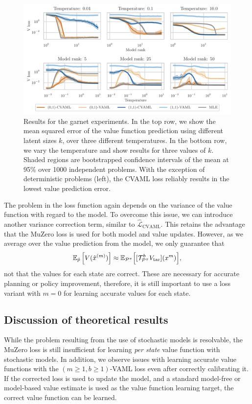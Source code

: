 \begin{figure}[t]
    \centering
    \includegraphics[width=.9\linewidth]{figures/lambda/plts/v_loss_comparison.pdf}
    \caption{Results for the garnet experiments. 
    In the top row, we show the mean squared error of the value function prediction using different latent sizes $k$, over three different temperatures. 
    In the bottom row, we vary the temperature and show results for three values of $k$. 
    Shaded regions are bootstrapped confidence intervals of the mean at 95\% over 1000 independent problems. 
    With the exception of deterministic problems (left), the CVAML loss reliably results in the lowest value prediction error. }
    \label{fig:garnet}
\end{figure}

The problem in the loss function again depends on the variance of the value function with regard to the model.
%
To overcome this issue, we can introduce another variance correction term, similar to $\hat{\mathcal{L}}_\mathrm{CVAML}$. 
This retains the advantage that the MuZero loss is used for both model and value updates.
However, as we average over the value prediction from the model, we only guarantee that 
\begin{align}
\mathbb{E}_{\hat{p}}\left[V(\hat{x}^{(m)})\right] \approx \mathbb{E}_{\P^\pi}\Bigl[[\mathcal{T}_{\P^\pi}^b V_\mathrm{tar}](x^{m})\Bigr],
\end{align}
not that the values for each state are correct.
These are necessary for accurate planning or policy improvement, therefore, it is still important to use a loss variant with $m=0$ for learning accurate values for each state.

\subsection{Discussion of theoretical results}
While the problem resulting from the use of stochastic models is resolvable, the MuZero loss is still insufficient for learning \emph{per state} value function with stochastic models.
In addition, we observe issues with learning accurate value functions with the $(m\geq1,b\geq1)$-VAML loss even after correctly calibrating it.
If the corrected loss is used to update the model, and a standard model-free or model-based value estimate is used as the value function learning target, the correct value function can be learned.

